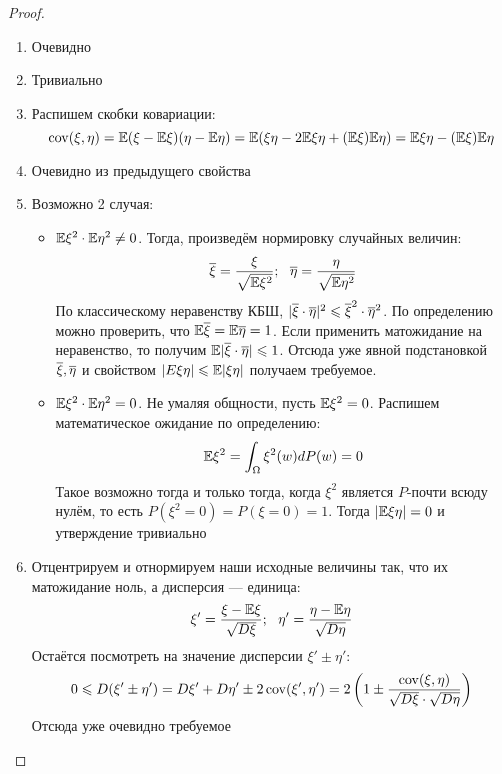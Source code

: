 \begin{proof}~
	\begin{enumerate}
		\item Очевидно
		
		\item Тривиально
		
		\item Распишем скобки ковариации:
		\[
			\operatorname{cov}(\xi, \eta) = \mathbb{E}(\xi - \mathbb{E}\xi)(\eta - \mathbb{E}\eta) = \mathbb{E}(\xi\eta - 2\mathbb{E}\xi\eta + (\mathbb{E}\xi)\mathbb{E}\eta) = \mathbb{E}\xi\eta - (\mathbb{E}\xi)\mathbb{E}\eta
		\]
		
		\item Очевидно из предыдущего свойства
		
		\item Возможно 2 случая:
		\begin{itemize}
			\item $\mathbb{E}\xi^2 \cdot \mathbb{E}\eta^2 \neq 0$. Тогда, произведём нормировку случайных величин:
			\[
				\ol{\xi} = \frac{\xi}{\sqrt{\E\xi^2}};\ \ \ol{\eta} = \frac{\eta}{\sqrt{\E\eta^2}}
			\]
			По классическому неравенству КБШ, \(|\overline{\xi} \cdot \overline{\eta}|^2 \leqslant \overline{\xi}^2 \cdot \overline{\eta}^2\). По определению можно проверить, что $\mathbb{E}\overline{\xi} = \mathbb{E}\overline{\eta} = 1$. Если применить матожидание на неравенство, то получим $\mathbb{E}|\overline{\xi} \cdot \overline{\eta}| \leqslant 1$. Отсюда уже явной подстановкой $\overline{\xi}, \overline{\eta}$ и свойством $|E\xi\eta| \leqslant \mathbb{E}|\xi\eta|$ получаем требуемое.
			
			\item $\mathbb{E}\xi^2 \cdot \mathbb{E}\eta^2 = 0$. Не умаляя общности, пусть $\mathbb{E}\xi^2 = 0$. Распишем математическое ожидание по определению:
			\[
				\mathbb{E}\xi^2 = \int_\Omega \xi^2(w)dP(w) = 0
			\]
			Такое возможно тогда и только тогда, когда $\xi^2$ является $P$-почти всюду нулём, то есть $P(\xi^2 = 0) = P(\xi = 0) = 1$. Тогда $|\mathbb{E}\xi\eta| = 0$ и утверждение тривиально
		\end{itemize}
	
		\item Отцентрируем и отнормируем наши исходные величины так, что их матожидание ноль, а дисперсия --- единица:
		\[
			\xi' = \frac{\xi - \mathbb{E}\xi}{\sqrt{D\xi}};\ \ \eta' = \frac{\eta - \mathbb{E}\eta}{\sqrt{D\eta}}
		\]
		Остаётся посмотреть на значение дисперсии $\xi' \pm \eta'$:
		\[
			0 \leqslant D(\xi' \pm \eta') = D\xi' + D\eta' \pm 2\operatorname{cov}(\xi', \eta') = 2\left(1 \pm \frac{\operatorname{cov}(\xi, \eta)}{\sqrt{D\xi} \cdot \sqrt{D\eta}}\right)
		\]
		Отсюда уже очевидно требуемое
	\end{enumerate}
\end{proof}

